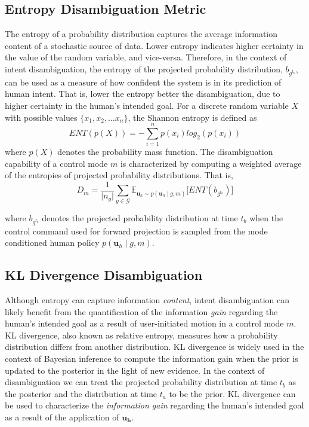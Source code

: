 \documentclass[conference]{IEEEtran}
\begin{document}
\subsection{Entropy Disambiguation Metric}\label{sssec:ent}
The entropy of a probability distribution captures the average information content of a stochastic source of data. Lower entropy indicates higher certainty in the value of the random variable, and vice-versa. Therefore, in the context of intent disambiguation, the entropy of the projected probability distribution, $b_{g^{t_b}}$, can be used as a measure of how confident the system is in its prediction of human intent. 
That is, lower the entropy better the disambiguation, due to higher certainty in the human's intended goal. For a discrete random variable $X$ with possible values $\{x_1, x_2,\dots x_n\}$, the Shannon entropy is defined as 
\begin{equation*}
ENT(p(X)) = -\sum_{i = 1}^{n} p(x_i)log_2(p(x_i))
\end{equation*}
where $p(X)$ denotes the probability mass function.
The disambiguation capability of a control mode $m$ is characterized by computing a weighted average of the entropies of projected probability distributions. That is, 
\begin{equation}\label{eq:ent}
	D_m = \frac{1}{\vert n_g \vert} \sum_{g \in \mathcal{G}}^{} \mathbb{E}_{\boldsymbol{u}_h \sim p(\boldsymbol{u}_h \; | \; g, m)}\Big[ENT(b_{g^{t_b}})\Big]
\end{equation}

where $b_{g^{t_b}}$ denotes the projected probability distribution at time $t_b$ when the control command used for forward projection is sampled from the mode conditioned human policy $p(\boldsymbol{u}_h \; |\; g, m)$.
\subsection{KL Divergence Disambiguation}\label{sssec:kl}
Although entropy can capture information \textit{content}, intent disambiguation can likely benefit from the quantification of the information \textit{gain} regarding the human's intended goal as a result of user-initiated motion in a control mode $m$. 
KL divergence, also known as relative entropy, measures how a probability distribution differs from another distribution. KL divergence is widely used in the context of Bayesian inference to compute the information gain when the prior is updated to the posterior in the light of new evidence. In the context of disambiguation we can treat the projected probability distribution at time $t_b$ as the posterior and the distribution at time $t_a$ to be the prior. KL divergence can be used to characterize the \textit{information gain} regarding the human's intended goal as a result of the application of $\boldsymbol{u_h}$.
\end{document}
